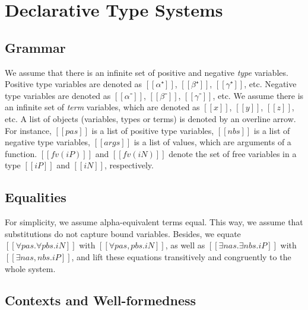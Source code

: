 \documentclass[a4,natbib=false]{article}
\begin{document}
\tableofcontents

\newpage

\section{Declarative Type Systems}

\subsection{Grammar}
We assume that there is an infinite set of positive and 
negative \emph{type} variables. Positive type variables are denoted as 
$[[α⁺]]$, $[[β⁺]]$, $[[γ⁺]]$, etc.
Negative type variables are denoted as $[[α⁻]]$, $[[β⁻]]$, $[[γ⁻]]$, etc.
We assume there is an infinite set of \emph{term} variables,
which are denoted as $[[x]]$, $[[y]]$, $[[z]]$, etc.
A list of objects (variables, types or terms) is denoted by
an overline arrow. For instance, $[[pas]]$ is a list of positive type variables, 
$[[nbs]]$ is a list of negative type variables, 
$[[args]]$ is a list of values, which are arguments of a function.
$[[fv(iP)]]$ and $[[fv(iN)]]$ denote the set of free variables 
in a type $[[iP]]$ and $[[iN]]$, respectively.

\bigskip


\begin{definition}
  \hfill
  \begin{multicols}{2}
    \ottgrammartabular{
      \ottiN\ottinterrule
    }

    \ottgrammartabular{
      \ottiP\ottinterrule
    }
    \columnbreak
  \end{multicols}
\end{definition}

\subsection{Equalities}
For simplicity, we assume alpha-equivalent terms equal.
This way, we assume that substitutions do not capture bound variables.
Besides, we equate
$[[∀pas.∀pbs.iN]]$ with $[[∀pas,pbs.iN]]$, 
as well as $[[∃nas.∃nbs.iP]]$ with $[[∃nas,nbs.iP]]$,
and lift these equations transitively and congruently 
to the whole system.

\subsection{Contexts and Well-formedness}
\end{document}
